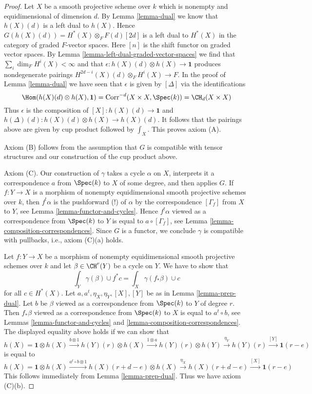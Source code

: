 \begin{proof}
\medskip\noindent
Let $X$ be a smooth projective scheme over $k$ which is
nonempty and equidimensional of dimension $d$. By Lemma \ref{lemma-dual}
we know that $h(X)(d)$ is a left dual to $h(X)$. Hence
$G(h(X)(d)) = H^*(X) \otimes_F F(d)[2d]$
is a left dual to $H^*(X)$ in the category of graded $F$-vector spaces.
Here $[n]$ is the shift functor on graded vector spaces.
By Lemma \ref{lemma-left-dual-graded-vector-spaces}
we find that $\sum_i \dim_F H^i(X) < \infty$ and that
$\epsilon : h(X)(d) \otimes h(X) \to \mathbf{1}$ produces
nondegenerate pairings $H^{2d - i}(X)(d) \otimes_F H^i(X) \to F$.
In the proof of Lemma \ref{lemma-dual} we have seen that
$\epsilon$ is given by $[\Delta]$ via the identifications
$$
\Hom(h(X)(d) \otimes h(X), \mathbf{1}) =
\text{Corr}^{-d}(X \times X, \Spec(k)) =
\CH_d(X \times X)
$$
Thus $\epsilon$ is the composition of $[X] : h(X)(d) \to \mathbf{1}$
and $h(\Delta)(d) : h(X)(d) \otimes h(X) \to h(X)(d)$. It follows
that the pairings above are given by cup product followed by
$\int_X$. This proves axiom (A).

\medskip\noindent
Axiom (B) follows from the assumption that $G$ is compatible
with tensor structures and our construction of the cup product above.

\medskip\noindent
Axiom (C). Our construction of $\gamma$ takes a cycle $\alpha$ on $X$,
interprets it a correspondence $a$ from $\Spec(k)$ to $X$ of some degree,
and then applies $G$. If $f : Y \to X$ is a morphism of nonempty
equidimensional smooth projective schemes over $k$, then
$f^!\alpha$ is the pushforward (!) of $\alpha$
by the correspondence $[\Gamma_f]$ from $X$ to $Y$, see
Lemma \ref{lemma-functor-and-cycles}. Hence
$f^!\alpha$ viewed as a correspondence from $\Spec(k)$ to $Y$
is equal to $a \circ [\Gamma_f]$, see
Lemma \ref{lemma-composition-correspondences}.
Since $G$ is a functor, we conclude
$\gamma$ is compatible with pullbacks, i.e., axiom (C)(a) holds.

\medskip\noindent
Let $f : Y \to X$ be a morphism of nonempty equidimensional
smooth projective schemes over $k$ and
let $\beta \in \CH^r(Y)$ be a cycle on $Y$. We have to show that
$$
\int_Y \gamma(\beta) \cup f^*c = \int_X \gamma(f_*\beta) \cup c
$$
for all $c \in H^*(X)$. Let $a, a^t, \eta_X, \eta_Y, [X], [Y]$
be as in Lemma \ref{lemma-prep-dual}.
Let $b$ be $\beta$ viewed as a correspondence from $\Spec(k)$ to $Y$
of degree $r$. Then $f_*\beta$ viewed as a correspondence from
$\Spec(k)$ to $X$ is equal to $a^t \circ b$, see
Lemmas \ref{lemma-functor-and-cycles} and
\ref{lemma-composition-correspondences}.
The displayed equality above holds if we can show that
$$
h(X) = \mathbf{1} \otimes h(X)
\xrightarrow{b \otimes 1}
h(Y)(r) \otimes h(X)
\xrightarrow{1 \otimes a}
h(Y)(r) \otimes h(Y)
\xrightarrow{\eta_Y}
h(Y)(r)
\xrightarrow{[Y]}
\mathbf{1}(r - e)
$$
is equal to
$$
h(X) = \mathbf{1} \otimes h(X)
\xrightarrow{a^t \circ b \otimes 1}
h(X)(r + d - e) \otimes h(X)
\xrightarrow{\eta_X}
h(X)(r + d - e)
\xrightarrow{[X]}
\mathbf{1}(r - e)
$$
This follows immediately from Lemma \ref{lemma-prep-dual}.
Thus we have axiom (C)(b).


\end{proof}
